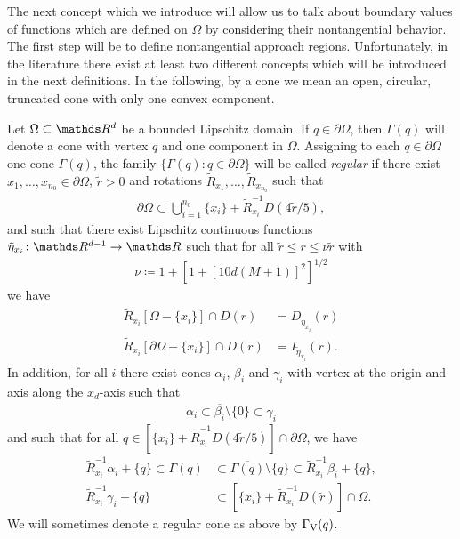 The next concept which we introduce will allow us to talk about boundary values of functions which are defined on $\Omega$ by considering their nontangential behavior.
The first step will be to define nontangential approach regions.
Unfortunately, in the literature there exist at least two different concepts which will be introduced in the next definitions.
  In the following, by a cone we mean an open, circular, truncated cone with only one convex component.

\begin{defn}
  \label{defn:regularFamilyOfCones}
  Let $\Omega \subset \R^d$ be a bounded Lipschitz domain.
  If $q \in \partial\Omega$, then $\Gamma(q)$ will denote a cone with vertex $q$ and one component in $\Omega$.
  Assigning to each $q \in \partial\Omega$ one cone $\Gamma(q)$, the family $\big\{ \Gamma(q) \colon q \in \partial\Omega \big\}$ will be called \emph{regular} if there exist $x_1, \dots,x_{n_0} \in \partial\Omega$, $\tilde r > 0$ and rotations $\tilde R_{x_1}, \dots, \tilde R_{x_{n_0}}$ such that
  \begin{align*}
    \partial\Omega \subset \bigcup_{i = 1}^{n_0} \{ x_i \} + \tilde R_{x_i}^{-1} D(4 \tilde r / 5),
  \end{align*}
  and such that there exist Lipschitz continuous functions $\tilde \eta_{x_i} \colon \R^{d - 1} \to \R$ such that for all $\tilde r \leq r \leq \nu \tilde r$ with 
  \begin{align*}
    \nu \coloneqq 1 + [ 1 + [10 d(M + 1)]^2]^{1/2}
  \end{align*}
  we have
  \begin{align*}
    \tilde R_{x_i}[\Omega - \{x_i\}] \cap D(r) &= D_{\tilde \eta_{x_i}}(r) \\
    \tilde R_{x_i}[\partial\Omega - \{x_i\}] \cap D(r) &= I_{\tilde \eta_{x_i}}(r).
  \end{align*}
  In addition, for all $i$ there exist cones $\alpha_i$, $\beta_i$ and $\gamma_i$ with vertex at the origin and axis along the $x_d$-axis such that
  \begin{align*}
    \alpha_i \subset \overline{\beta_i} \setminus\{0\} \subset \gamma_i
  \end{align*}
  and such that for all $q \in [ \{ x_i\} + \tilde R_{x_i}^{-1} D(4 \tilde r / 5)] \cap \partial\Omega$, we have
  \begin{align*}
    \tilde R_{x_i}^{-1} \alpha_i + \{ q\} \subset \Gamma(q) &\subset \overline{\Gamma(q)} \setminus \{q\} \subset \tilde R_{x_i}^{-1} \beta_i + \{ q\}, \\
    \tilde R_{x_i}^{-1} \gamma_i + \{q\} &\subset [\{ x_i\} + \tilde R_{x_i}^{-1} D(\tilde r)] \cap \Omega.
  \end{align*}
  We will sometimes denote a regular cone as above by $\Gamma_\mathrm{V}(q)$.
\end{defn}

